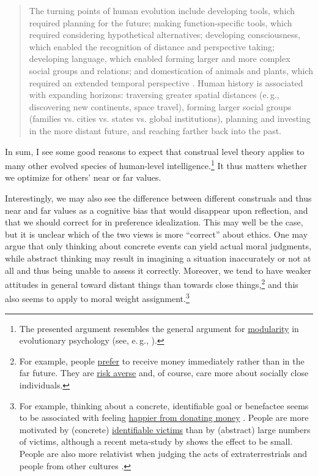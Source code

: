 \begin{quote}
The turning points of human evolution include developing tools, which
required planning for the future; making function-specific tools, which
required considering hypothetical alternatives; developing
consciousness, which enabled the recognition of distance and perspective
taking; developing language, which enabled forming larger and more
complex social groups and relations; and domestication of animals and
plants, which required an extended temporal perspective \parencite{flinn2005ecological}. Human
history is associated with expanding horizons: traversing greater spatial distances (e.\,g.,
discovering new
continents, space travel), forming larger social groups (families vs.
cities vs. states vs. global institutions), planning and investing in
the more distant future, and reaching farther back into the past.
\end{quote}

In sum, I see some good reasons to expect that construal level theory
applies to many other evolved species of human-level
intelligence.\footnote{The presented argument resembles the general
  argument for
  \href{https://en.wikipedia.org/wiki/Modularity_of_mind}{modularity}
  in evolutionary psychology (see, e.\,g., \cite{cosmides1994origins}).} It thus matters whether we
  optimize for others' near or far values.

Interestingly, we may also see the difference between different
construals and thus near and far values as a cognitive bias that would
disappear upon reflection, and that we should correct for in preference
idealization. This may well be the case, but it is unclear which of the
two views is more ``correct'' about ethics. One may argue that only
thinking about concrete events can yield actual moral judgments, while
abstract thinking may result in imagining a situation inaccurately or
not at all and thus being unable to assess it correctly. Moreover, we
tend to have weaker attitudes in general toward distant things than
towards close things,\footnote{For example, people
  \href{https://en.wikipedia.org/wiki/Time_preference}{prefer} to
  receive money immediately rather than in the far future. They are
  \href{https://en.wikipedia.org/wiki/Risk_aversion}{risk averse}
  and, of course, care more about socially close individuals.}
and this also seems to apply to moral weight assignment.\footnote{For
  example, thinking about a concrete, identifiable goal or benefactee
  seems to be associated with feeling
  \href{https://en.wikipedia.org/wiki/Warm-glow_giving}{happier
  from donating money} \parencite{Rudd2014-getting}. People are more motivated by (concrete)
  \href{https://en.wikipedia.org/wiki/Identifiable_victim_effect}{identifiable
  victims} than by (abstract) large numbers of victims, although a
  recent meta-study by \citet{Lee2016-lb} shows the
  effect to be small. People are
  also more relativist when judging the acts of extraterrestrials and
  people from other cultures \parencite{Sarkissian2011-be}.}

